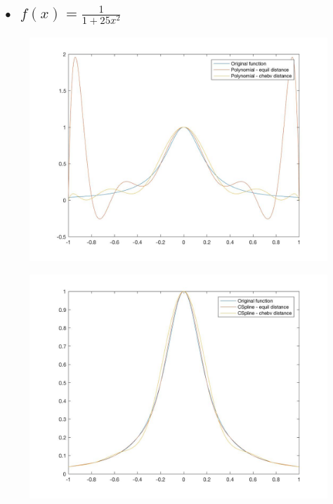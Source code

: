 \documentclass[11pt]{article} %
\begin{document}
\subsection{• $f(x)=\frac{1}{1+25x^{2}}$}
\begin{figure}[H]
\centering
\begin{minipage}{.5\textwidth}
  \centering
  \includegraphics[width=1.1\linewidth]{e42p.jpg}
  \label{fig:test1}
\end{minipage}%
\begin{minipage}{.5\textwidth}
  \centering
  \includegraphics[width=1.1\linewidth]{e42s.jpg}
  \label{fig:test2}
\end{minipage}
\end{figure}
\end{document}

